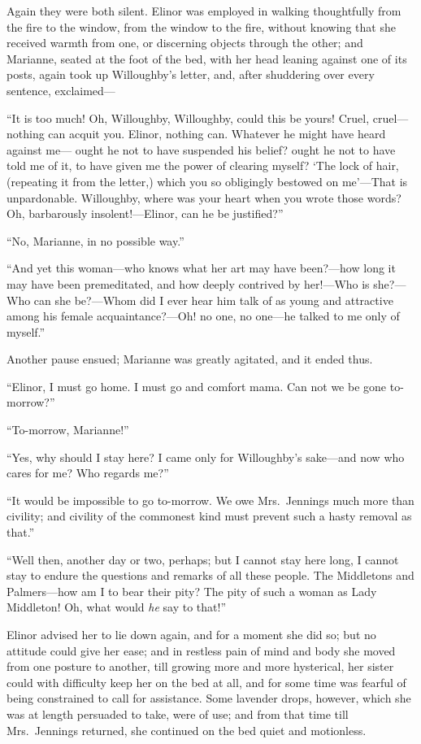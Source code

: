 Again they were both silent.  Elinor was employed
in walking thoughtfully from the fire to the window,
from the window to the fire, without knowing that she
received warmth from one, or discerning objects through
the other; and Marianne, seated at the foot of the bed,
with her head leaning against one of its posts,
again took up Willoughby's letter, and, after shuddering
over every sentence, exclaimed---%

``It is too much! Oh, Willoughby, Willoughby, could this
be yours!  Cruel, cruel---nothing can acquit you.  Elinor,
nothing can.  Whatever he might have heard against me---%
ought he not to have suspended his belief? ought he not to
have told me of it, to have given me the power of clearing
myself? `The lock of hair, (repeating it from the letter,)
which you so obligingly bestowed on me'---That is unpardonable.
Willoughby, where was your heart when you wrote those words?
Oh, barbarously insolent!---Elinor, can he be justified?''

``No, Marianne, in no possible way.''

``And yet this woman---who knows what her art may
have been?---how long it may have been premeditated,
and how deeply contrived by her!---Who is she?---Who can
she be?---Whom did I ever hear him talk of as young and
attractive among his female acquaintance?---Oh! no one,
no one---he talked to me only of myself.''

Another pause ensued; Marianne was greatly agitated,
and it ended thus.

``Elinor, I must go home.  I must go and comfort mama.
Can not we be gone to-morrow?''

``To-morrow, Marianne!''

``Yes, why should I stay here? I came only for
Willoughby's sake---and now who cares for me? Who regards me?''

``It would be impossible to go to-morrow. We owe
Mrs.\ Jennings much more than civility; and civility of
the commonest kind must prevent such a hasty removal as that.''

``Well then, another day or two, perhaps; but I cannot
stay here long, I cannot stay to endure the questions
and remarks of all these people.  The Middletons and
Palmers---how am I to bear their pity?  The pity of such
a woman as Lady Middleton!  Oh, what would \emph{he} say to that!''

Elinor advised her to lie down again, and for a
moment she did so; but no attitude could give her ease;
and in restless pain of mind and body she moved from one
posture to another, till growing more and more hysterical,
her sister could with difficulty keep her on the bed at all,
and for some time was fearful of being constrained to call
for assistance.  Some lavender drops, however, which she
was at length persuaded to take, were of use; and from
that time till Mrs.\ Jennings returned, she continued
on the bed quiet and motionless.



